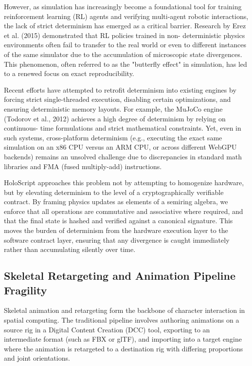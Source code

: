 \documentclass[sigconf,nonacm]{acmart}
\begin{document}
However, as simulation has increasingly become a foundational tool for training
reinforcement learning (RL) agents and verifying multi-agent robotic
interactions, the lack of strict determinism has emerged as a critical barrier.
Research by Erez et al. (2015) demonstrated that RL policies trained in non-
deterministic physics environments often fail to transfer to the real world or
even to different instances of the same simulator due to the accumulation of
microscopic state divergences. This phenomenon, often referred to as the
"butterfly effect" in simulation, has led to a renewed focus on exact
reproducibility.

Recent efforts have attempted to retrofit determinism into existing engines by
forcing strict single-threaded execution, disabling certain optimizations, and
ensuring deterministic memory layouts. For example, the MuJoCo engine (Todorov
et al., 2012) achieves a high degree of determinism by relying on continuous-
time formulations and strict mathematical constraints. Yet, even in such
systems, cross-platform determinism (e.g., executing the exact same simulation
on an x86 CPU versus an ARM CPU, or across different WebGPU backends) remains an
unsolved challenge due to discrepancies in standard math libraries and FMA
(fused multiply-add) instructions.

HoloScript approaches this problem not by attempting to homogenize hardware, but
by elevating determinism to the level of a cryptographically verifiable
contract. By framing physics updates as elements of a semiring algebra, we
enforce that all operations are commutative and associative where required, and
that the final state is hashed and verified against a canonical signature. This
moves the burden of determinism from the hardware execution layer to the
software contract layer, ensuring that any divergence is caught immediately
rather than accumulating silently over time.

\subsection{Skeletal Retargeting and Animation Pipeline Fragility} Skeletal
animation and retargeting form the backbone of character interaction in spatial
computing. The traditional pipeline involves authoring animations on a source
rig in a Digital Content Creation (DCC) tool, exporting to an intermediate
format (such as FBX or glTF), and importing into a target engine where the
animation is retargeted to a destination rig with differing proportions and
joint orientations.
\end{document}
